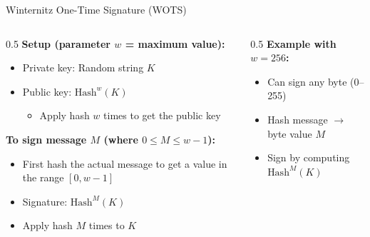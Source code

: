 \ifdefined\PRESENTATION\else\PassOptionsToClass{handout}{beamer}\fi\documentclass[aspectratio=169, lualatex]{beamer}
\begin{document}
\begin{frame}{Winternitz One-Time Signature (WOTS)}
	\begin{columns}[c]
		\begin{column}{0.5\textwidth}
			\textbf{Setup (parameter $w$ = maximum value):}
			\begin{itemize}
				\item Private key: Random string $K$
				\item Public key: $\text{Hash}^w(K)$
				      \begin{itemize}
					      \item Apply hash $w$ times to get the public key
				      \end{itemize}
			\end{itemize}

			\textbf{To sign message $M$ (where $0 \leq M \leq w-1$):}
			\begin{itemize}
				\item First hash the actual message to get a value in the range $[0, w-1]$
				\item Signature: $\text{Hash}^M(K)$
				\item Apply hash $M$ times to $K$
			\end{itemize}
		\end{column}
		\begin{column}{0.5\textwidth}
			\textbf{Example with $w = 256$:}
			\begin{itemize}
				\item Can sign any byte (0--255)
				\item Hash message $\rightarrow$ byte value $M$
				\item Sign by computing $\text{Hash}^M(K)$
			\end{itemize}
		\end{column}
	\end{columns}
\end{frame}
\end{document}

